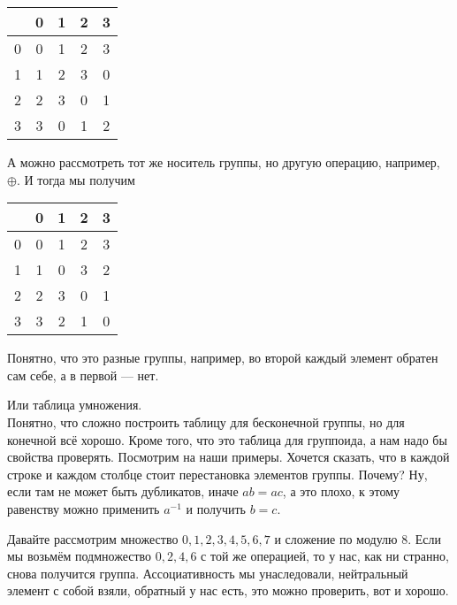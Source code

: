 \documentclass{article}
\begin{document}
\begin{itemize}
\begin{Example}
\begin{center}
\begin{tabular}{|c|cccc|}
                    \hline
                    &0&1&2&3\\
                    \hline
                    0&0&1&2&3\\
                    1&1&2&3&0\\
                    2&2&3&0&1\\
                    3&3&0&1&2\\
                    \hline
                \end{tabular}
            \end{center}
            А можно рассмотреть тот же носитель группы, но другую операцию, например, $\oplus$. И тогда мы получим
            \begin{center}
                \begin{tabular}{|c|cccc|}
                    \hline
                    &0&1&2&3\\
                    \hline
                    0&0&1&2&3\\
                    1&1&0&3&2\\
                    2&2&3&0&1\\
                    3&3&2&1&0\\
                    \hline
                \end{tabular}
            \end{center}
            Понятно, что это разные группы, например, во второй каждый элемент обратен сам себе, а в первой --- нет.
        \end{Example}
        \begin{Comment}
            Или таблица умножения.\\
            Понятно, что сложно построить таблицу для бесконечной группы, но для конечной всё хорошо. Кроме того, что это таблица для группоида, а нам надо бы свойства проверять. Посмотрим на наши примеры. Хочется сказать, что в каждой строке и каждом столбце стоит перестановка элементов группы. Почему? Ну, если там не может быть дубликатов, иначе $ab=ac$, а это плохо, к этому равенству можно применить $a^{-1}$ и получить $b=c$.
        \end{Comment}
        \begin{Comment}
            Давайте рассмотрим множество ${0,1,2,3,4,5,6,7}$ и сложение по модулю 8. Если мы возьмём подмножество ${0,2,4,6}$ с той же операцией, то у нас, как ни странно, снова получится группа. Ассоциативность мы унаследовали, нейтральный элемент с собой взяли, обратный у нас есть, это можно проверить, вот и хорошо. 

\end{Comment}
\end{itemize}
\end{document}
